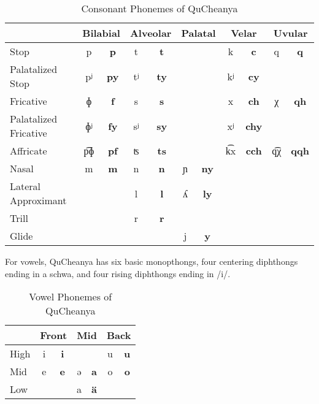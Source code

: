\documentclass{article}
\begin{document}
\begin{table}[h]
\caption{Consonant Phonemes of QuCheanya}
\label{table:consonants}
\begin{tabular}{l| c c | c c | c c | c c | c c}
& \multicolumn{2}{c}{Bilabial} & \multicolumn{2}{c}{Alveolar} & \multicolumn{2}{c}{Palatal} & \multicolumn{2}{c}{Velar} & \multicolumn{2}{c}{Uvular} \\
\hline
Stop & p & \textbf{p} & t & \textbf{t} & & & k & \textbf{c} & q & \textbf{q} \\
Palatalized Stop & pʲ & \textbf{py} & tʲ & \textbf{ty} & & & kʲ & \textbf{cy} & & \\
Fricative & ɸ & \textbf{f} & s & \textbf{s} & & & x & \textbf{ch} & χ & \textbf{qh} \\
Palatalized Fricative & ɸʲ & \textbf{fy} & sʲ & \textbf{sy} & & & xʲ & \textbf{chy} & & \\
Affricate & p͡ɸ & \textbf{pf} & ʦ & \textbf{ts} & & & k͡x & \textbf{cch} & q͡χ & \textbf{qqh} \\
Nasal & m & \textbf{m} & n & \textbf{n} & ɲ & \textbf{ny} & & & & \\
Lateral Approximant & & & l & \textbf{l} & ʎ & \textbf{ly} & & & & \\
Trill & & & r & \textbf{r} & & & & & & \\
Glide & & & & & j & \textbf{y} & & & & \\
\hline
\end{tabular}
\end{table}

For vowels, QuCheanya has six basic monopthongs, four centering diphthongs ending in a schwa, and four rising diphthongs ending in /i/.

\begin{table}[h]
\caption{Vowel Phonemes of QuCheanya}
\label{table:vowels}
\begin{tabular}{l| c c | c c | c c}
& \multicolumn{2}{c}{Front} & \multicolumn{2}{c}{Mid} & \multicolumn{2}{c}{Back} \\
\hline
High & i & \textbf{i} & & & u & \textbf{u} \\
Mid & e & \textbf{e} & ə & \textbf{a} & o & \textbf{o} \\
Low & & & a & \textbf{\"a} & & \\
\end{tabular}
\end{table}
\end{document}
